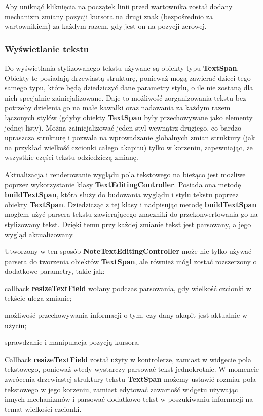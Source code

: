 Aby uniknąć kliknięcia na początek linii przed wartownika został dodany mechanizm zmiany pozycji kursora na drugi znak (bezpośrednio za wartownikiem) za każdym razem, gdy jest on na pozycji zerowej.

\subsubsection{Wyświetlanie tekstu}

Do wyświetlania stylizowanego tekstu używane są obiekty typu \textbf{TextSpan}. Obiekty te posiadają drzewiastą strukturę, ponieważ mogą zawierać dzieci tego samego typu, które będą dziedziczyć dane parametry stylu, o ile nie zostaną dla nich specjalnie zainicjalizowane. Daje to możliwość zorganizowania tekstu bez potrzeby dzielenia go na małe kawałki oraz nadawania za każdym razem łączonych stylów (gdyby obiekty \textbf{TextSpan} były przechowywane jako elementy jednej listy). Można zainicjalizować jeden styl wewnątrz drugiego, co bardzo upraszcza strukturę i pozwala na wprowadzanie globalnych zmian struktury (jak na przykład wielkość czcionki całego akapitu) tylko w korzeniu, zapewniając, że wszystkie części tekstu odziedziczą zmianę.

Aktualizacja i renderowanie wyglądu pola tekstowego na bieżąco jest możliwe poprzez wykorzystanie klasy \textbf{TextEditingController}. Posiada ona metodę \textbf{buildTextSpan}, która służy do budowania wyglądu i stylu tekstu poprzez obiekty \textbf{TextSpan}. Dziedzicząc z tej klasy i nadpisując metodę \textbf{buildTextSpan} mogłem użyć parsera tekstu zawierającego znaczniki do przekonwertowania go na stylizowany tekst.
Dzięki temu przy każdej zmianie tekst jest parsowany, a jego wygląd aktualizowany.

Utworzony w ten sposób \textbf{NoteTextEditingController} może nie tylko używać parsera do tworzenia obiektów \textbf{TextSpan}, ale również mógł zostać rozszerzony o dodatkowe parametry, takie jak:

\begin{compactitem}
    \item callback \textbf{resizeTextField} wołany podczas parsowania, gdy wielkość czcionki w tekście ulega zmianie;
    \item możliwość przechowywania informacji o tym, czy dany akapit jest aktualnie w użyciu;
    \item sprawdzanie i manipulacja pozycją kursora.
\end{compactitem}

Callback \textbf{resizeTextField} został użyty w kontrolerze, zamiast w widgecie pola tekstowego, ponieważ wtedy wystarczy parsować tekst jednokrotnie. W momencie zwrócenia drzewiastej struktury tekstu \textbf{TextSpan} możemy ustawić rozmiar pola tekstowego w jego korzeniu, zamiast edytować zawartość widgetu używając innych mechanizmów i parsować dodatkowo tekst w poszukiwaniu informacji na temat wielkości czcionki.

